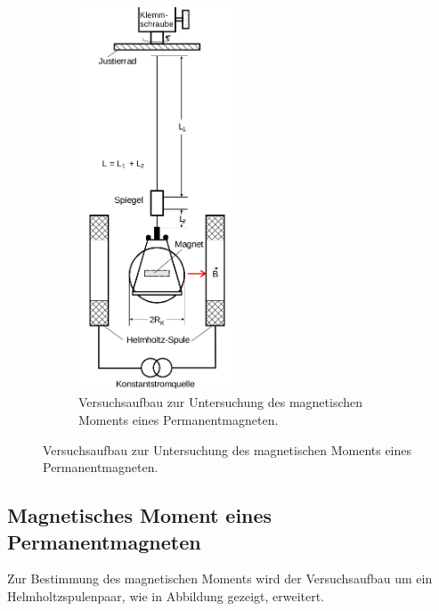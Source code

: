 \begin{figure}
\begin{subfigure}[b]{0.48\textwidth}
		\includegraphics[width=0.5\textwidth]{Bilder/helmholtz.png}
		\caption{Versuchsaufbau zur Untersuchung des magnetischen Moments eines Permanentmagneten. \cite{Anleitung}}
		\label{fig:helmholtz}
	\end{subfigure}

\end{figure}

\subsection{Magnetisches Moment eines Permanentmagneten}

Zur Bestimmung des magnetischen Moments wird der Versuchsaufbau um ein Helmholtzspulenpaar, wie in Abbildung  gezeigt, erweitert.
\FloatBarrier
